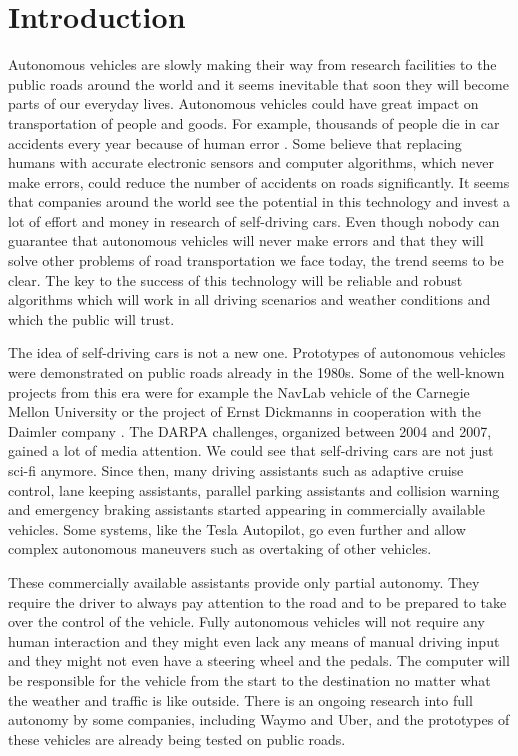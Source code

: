 \chapter*{Introduction}

Autonomous vehicles are slowly making their way from research facilities to the public roads around the world and it seems inevitable that soon they will become parts of our everyday lives. Autonomous vehicles could have great impact on transportation of people and goods. For example, thousands of people die in car accidents every year because of human error \cite{Road_accidents}. Some believe that replacing humans with accurate electronic sensors and computer algorithms, which never make errors, could reduce the number of accidents on roads significantly. It seems that companies around the world see the potential in this technology and invest a lot of effort and money in research of self-driving cars. Even though nobody can guarantee that autonomous vehicles will never make errors and that they will solve other problems of road transportation we face today, the trend seems to be clear. The key to the success of this technology will be reliable and robust algorithms which will work in all driving scenarios and weather conditions and which the public will trust. 

The idea of self-driving cars is not a new one. Prototypes of autonomous vehicles were demonstrated on public roads already in the 1980s. Some of the well-known projects from this era were for example the NavLab vehicle of the Carnegie Mellon University \cite{NavLab} or the project of Ernst Dickmanns in cooperation with the Daimler company \cite{Ernst_Dickmanns}. The DARPA challenges, organized between 2004 and 2007, gained a lot of media attention. We could see that self-driving cars are not just sci-fi anymore. Since then, many driving assistants such as adaptive cruise control, lane keeping assistants, parallel parking assistants and collision warning and emergency braking assistants started appearing in commercially available vehicles. Some systems, like the Tesla Autopilot, go even further and allow complex autonomous maneuvers such as overtaking of other vehicles.

These commercially available assistants provide only partial autonomy. They require the driver to always pay attention to the road and to be prepared to take over the control of the vehicle. Fully autonomous vehicles will not require any human interaction and they might even lack any means of manual driving input and they might not even have a steering wheel and the pedals. The computer will be responsible for the vehicle from the start to the destination no matter what the weather and traffic is like outside. There is an ongoing research into full autonomy by some companies, including Waymo and Uber, and the prototypes of these vehicles are already being tested on public roads.

